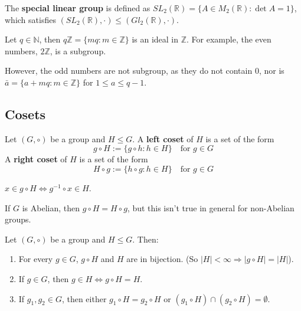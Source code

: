 \begin{definition}
	The \textbf{special linear group} is defined as $SL_2(\mathbb{R}) = \{ A \in M_2(\mathbb{R}): \det A = 1 \}$, which satisfies $(SL_2(\mathbb{R}), \cdot) \le (Gl_2(\mathbb{R}), \cdot)$.
\end{definition}

\begin{example}
	Let $q \in \mathbb{N}$, then $q \mathbb{Z} = \{ m q: m \in \mathbb{Z} \}$ is an ideal in $\mathbb{Z}$. For example, the even numbers, $2 \mathbb{Z}$, is a subgroup.

	However, the odd numbers are not subgroup, as they do not contain $0$, nor is $\bar{a} = \{ a + mq: m \in \mathbb{Z} \}$ for $1 \le a \le q - 1$.
\end{example}

\subsection{Cosets}

\begin{definition}
	Let $(G, \circ)$ be a group and $H \le G$. A \textbf{left coset} of $H$ is a set of the form
	\[
		g \circ H := \{ g \circ h: h \in H \} \quad \text{for } g \in G
	\]
	A \textbf{right coset} of $H$ is a set of the form
	\[
		H \circ g := \{ h \circ g: h \in H \} \quad \text{for } g \in G
	\]
\end{definition}

\begin{remark}
	$x \in g \circ H \Longleftrightarrow g^{-1} \circ x \in H$.
\end{remark}

\begin{remark}
	If $G$ is Abelian, then $g \circ H = H \circ g$, but this isn't true in general for non-Abelian groups.
\end{remark}

\begin{proposition}
	Let $(G, \circ)$ be a group and $H \le G$. Then:
	\begin{enumerate}
		\item For every $g \in G$, $g \circ H$ and $H$ are in bijection. (So $|H| < \infty \Rightarrow |g \circ H| = |H|$).
		\item If $g \in G$, then $g \in H \Longleftrightarrow g \circ H = H$.
		\item If $g_1, g_2 \in G$, then either $g_1 \circ H = g_2 \circ H$ or $(g_1 \circ H) \cap (g_2 \circ H) = \emptyset$.
	\end{enumerate}
\end{proposition}

